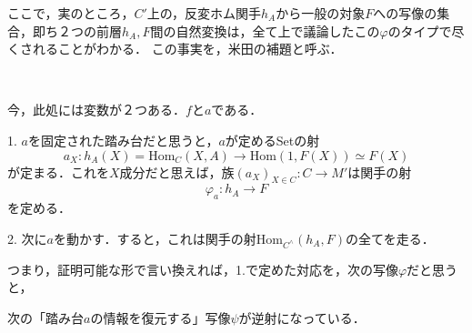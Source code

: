 \documentclass[uplatex, dvipdfmx]{jsreport}
\begin{document}
ここで，実のところ，$C'$上の，反変ホム関手$h_A$から一般の対象$F$への写像の集合，即ち２つの前層$h_A,F$間の自然変換は，全て上で議論したこの$\varphi$のタイプで尽くされることがわかる．
この事実を，米田の補題と呼ぶ．
\begin{screen}
    \begin{theorem}\label{Yoneda's-lemma}　

        \begin{center}
        \end{center}

        今，此処には変数が２つある．$f$と$a$である．

        1. $a$を固定された踏み台だと思うと，$a$が定めるSetの射
        \[ a_X:h_A(X)=\mathrm{Hom}_C(X,A) \to \mathrm{Hom}(1,F(X))\simeq F(X) \]
        が定まる．これを$X$成分だと思えば，族$(a_X)_{X\in C}:C\to M'$は関手の射
        \[ \varphi_a:h_A\to F \]
        を定める．

        2. 次に$a$を動かす．すると，これは関手の射$\mathrm{Hom}_{C^\wedge}(h_A,F)$の全てを走る．
        
        つまり，証明可能な形で言い換えれば，1.で定めた対応を，次の写像$\varphi$だと思うと，
        \begin{center}
        \end{center}
        次の「踏み台$a$の情報を復元する」写像$\psi$が逆射になっている．
        \begin{center}
        \end{center}

    \end{theorem}
\end{screen}
\end{document}
